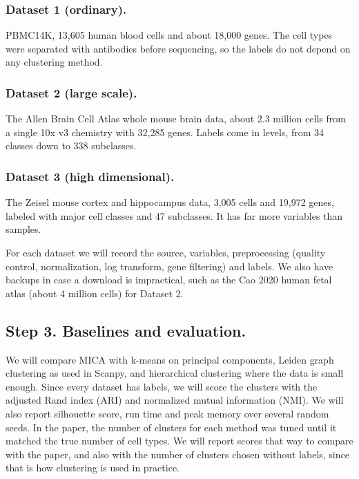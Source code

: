 \documentclass[conference]{IEEEtran}
\begin{document}
\subsubsection{Dataset 1 (ordinary).}
PBMC14K, 13,605 human blood cells and about 18,000 genes. The cell types were separated with antibodies before sequencing, so the labels do not depend on any clustering method.

\subsubsection{Dataset 2 (large scale).}
The Allen Brain Cell Atlas whole mouse brain data, about 2.3 million cells from a single 10x v3 chemistry with 32,285 genes. Labels come in levels, from 34 classes down to 338 subclasses.

\subsubsection{Dataset 3 (high dimensional).}
The Zeisel mouse cortex and hippocampus data, 3,005 cells and 19,972 genes, labeled with major cell classes and 47 subclasses. It has far more variables than samples.

For each dataset we will record the source, variables, preprocessing (quality control, normalization, log transform, gene filtering) and labels. We also have backups in case a download is impractical, such as the Cao 2020 human fetal atlas (about 4 million cells) for Dataset 2. 

\subsection{Step 3. Baselines and evaluation.}
We will compare MICA with k-means on principal components, Leiden graph clustering as used in Scanpy, and hierarchical clustering where the data is small enough. Since every dataset has labels, we will score the clusters with the adjusted Rand index (ARI) and normalized mutual information (NMI). We will also report silhouette score, run time and peak memory over several random seeds. In the paper, the number of clusters for each method was tuned until it matched the true number of cell types. We will report scores that way to compare with the paper, and also with the number of clusters chosen without labels, since that is how clustering is used in practice.
\end{document}
